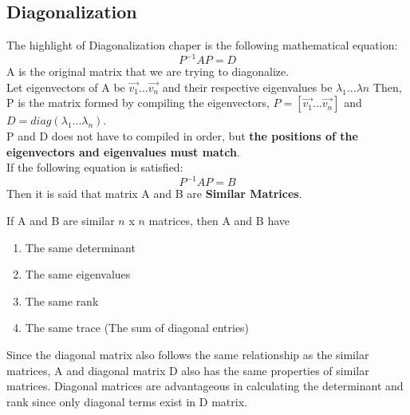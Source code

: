 \documentclass[12pt]{article}
\begin{document}
\subsection{Diagonalization}
The highlight of Diagonalization chaper is the following mathematical equation:
\begin{equation}
P^{-1}AP=D 
\end{equation}
A is the original matrix that we are trying to diagonalize.\\
Let eigenvectors of A be ${\vec{v_1}...\vec{v_n}}$ and their respective eigenvalues be ${\lambda_1...\lambda{n}}$
Then, P is the matrix formed by compiling the eigenvectors, $P = [\vec{v_1}...\vec{v_n}]$ and\\
$D = diag(\lambda_1...\lambda_n)$.\\
P and D does not have to compiled in order, but \textbf{the positions of the eigenvectors and eigenvalues must match}.\\
If the following equation is satisfied:
\begin{equation}
P^{-1}AP=B 
\end{equation}
Then it is said that matrix A and B are \textbf{Similar Matrices}.

If A and B are similar $n$ x $n$ matrices, then A and B have
\begin{enumerate}
\item The same determinant
\item The same eigenvalues 
\item The same rank
\item The same trace (The sum of diagonal entries)
\end{enumerate} \cite{Textbook}
\noindent 
Since the diagonal matrix also follows the same relationship as the similar matrices, A and diagonal matrix D also has the same properties of similar matrices. Diagonal matrices are advantageous in calculating the determinant and rank since only diagonal terms exist in D matrix.
\end{document}
